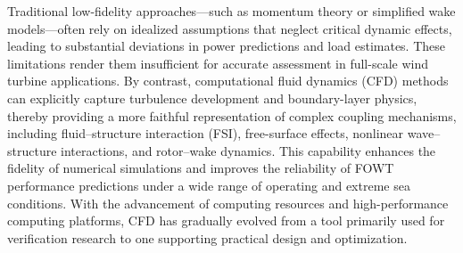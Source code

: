 \documentclass[%
 aip,
 amsmath,amssymb,
 reprint,%
]{revtex4-1}
\begin{document}
Traditional low-fidelity approaches—such as momentum theory or simplified wake models—often rely on idealized assumptions that neglect critical dynamic effects, leading to substantial deviations in power predictions and load estimates. These limitations render them insufficient for accurate assessment in full-scale wind turbine applications. By contrast, computational fluid dynamics (CFD) methods can explicitly capture turbulence development and boundary-layer physics, thereby providing a more faithful representation of complex coupling mechanisms, including fluid–structure interaction (FSI), free-surface effects, nonlinear wave–structure interactions, and rotor–wake dynamics. This capability enhances the fidelity of numerical simulations and improves the reliability of FOWT performance predictions under a wide range of operating and extreme sea conditions. With the advancement of computing resources and high-performance computing platforms, CFD has gradually evolved from a tool primarily used for verification research to one supporting practical design and optimization\citet{tran2018cfd, cheng2019numerical, liu2017establishing, wang2021verification, zhang2023aerodynamic}. 


\end{document}
